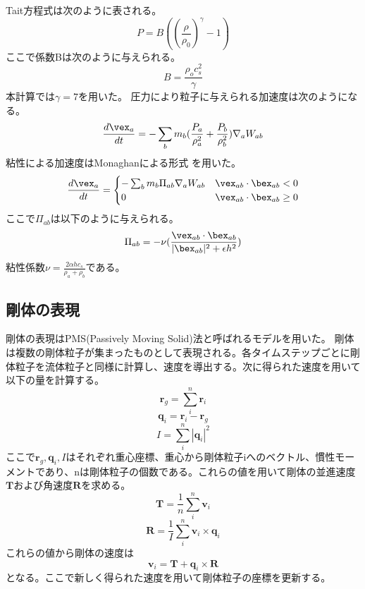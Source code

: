 \documentclass[]{jsarticle}
\begin{document}
Tait方程式は次のように表される。
\begin{equation}
P=B((\frac{\rho}{\rho_0})^\gamma-1)
\end{equation}
ここで係数Bは次のように与えられる。
\begin{equation}
B=\frac{\rho_oc_s^2}{\gamma}
\end{equation}
本計算では$\gamma=7$を用いた。
圧力により粒子に与えられる加速度は次のようになる。
\begin{equation}
\frac{d\vex_a}{dt}=-\sum_bm_b(\frac{P_a}{\rho_a^2}+\frac{P_b}{\rho_b^2})\nabla_aW_{ab}
\end{equation}
粘性による加速度はMonaghanによる形式 \cite{Monaghan2005}を用いた。
\begin{equation}
\frac{d\vex_a}{dt}=\begin{cases}
  -\sum_bm_b\Pi_{ab}\nabla_aW_{ab} & \vex_{ab}\cdot\bex_{ab}<0 \\
  0 & \vex_{ab}\cdot\bex_{ab}\geq0
\end{cases}
\end{equation}
ここで$\Pi_{ab}$は以下のように与えられる。
\begin{equation}
\Pi_{ab}=-\nu(\frac{\vex_{ab}\cdot\bex_{ab}}{|\bex_{ab}|^2+\epsilon h^2})
\end{equation}
粘性係数$\nu=\frac{2\alpha h c_s}{\rho_a+\rho_b}$である。

\subsection{剛体の表現}
剛体の表現はPMS(Passively Moving Solid)法\cite{Gotoh2018}と呼ばれるモデルを用いた。
剛体は複数の剛体粒子が集まったものとして表現される。各タイムステップごとに剛体粒子を流体粒子と同様に計算し、速度を導出する。次に得られた速度を用いて以下の量を計算する。
\begin{equation}
  \bm{r}_g=\sum_{i}^n{\bm{r}_i}
\end{equation}
\begin{equation}
  \bm{q}_i=\bm{r}_i-\bm{r}_g
\end{equation}
\begin{equation}
  I=\sum_{i}^n{|\bm{q}_i|^2}
\end{equation}
ここで$\bm{r}_g,\bm{q}_i,I$はそれぞれ重心座標、重心から剛体粒子iへのベクトル、慣性モーメントであり、nは剛体粒子の個数である。これらの値を用いて剛体の並進速度$\bm{T}$および角速度$\bm{R}$を求める。
\begin{equation}
  \bm{T}=\frac{1}{n}\sum_{i}^n{\bm{v}_i}
\end{equation}
\begin{equation}
  \bm{R}=\frac{1}{I}\sum_{i}^n{\bm{v}_i\times\bm{q}_i}
\end{equation}
これらの値から剛体の速度は
\begin{equation}
\bm{v}_i=\bm{T}+\bm{q}_i\times\bm{R}
\end{equation}
となる。ここで新しく得られた速度を用いて剛体粒子の座標を更新する。
\end{document}
